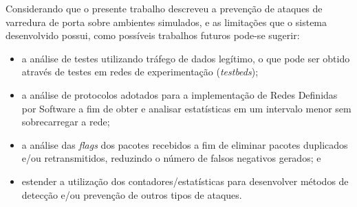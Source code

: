 Considerando que o presente trabalho descreveu a prevenção de ataques de varredura de porta sobre ambientes simulados, e as limitações que o sistema desenvolvido possui, como possíveis trabalhos futuros pode-se sugerir:
\begin{itemize}
    \item a análise de testes utilizando tráfego de dados legítimo, o que pode ser obtido através de testes em redes de experimentação (\textit{testbeds});
    \item a análise de protocolos adotados para a implementação de Redes Definidas por Software a fim de obter e analisar estatísticas em um intervalo menor sem sobrecarregar a rede;
    \item a análise das \textit{flags} dos pacotes recebidos a fim de eliminar pacotes duplicados e/ou retransmitidos, reduzindo o número de falsos negativos gerados; e
    \item estender a utilização dos contadores/estatísticas para desenvolver métodos de detecção e/ou prevenção de outros tipos de ataques.
\end{itemize}